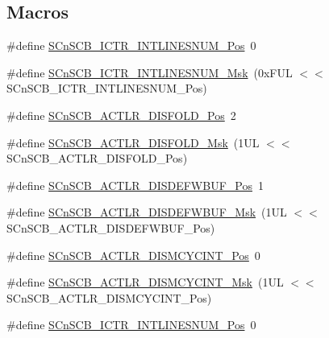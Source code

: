 \subsection*{Macros}
\begin{DoxyCompactItemize}
\item 
\#define \mbox{\hyperlink{group___c_m_s_i_s___s_cn_s_c_b_ga0777ddf379af50f9ca41d40573bfffc5}{S\+Cn\+S\+C\+B\+\_\+\+I\+C\+T\+R\+\_\+\+I\+N\+T\+L\+I\+N\+E\+S\+N\+U\+M\+\_\+\+Pos}}~0
\item 
\#define \mbox{\hyperlink{group___c_m_s_i_s___s_cn_s_c_b_ga3efa0f5210051464e1034b19fc7b33c7}{S\+Cn\+S\+C\+B\+\_\+\+I\+C\+T\+R\+\_\+\+I\+N\+T\+L\+I\+N\+E\+S\+N\+U\+M\+\_\+\+Msk}}~(0x\+F\+U\+L $<$$<$ S\+Cn\+S\+C\+B\+\_\+\+I\+C\+T\+R\+\_\+\+I\+N\+T\+L\+I\+N\+E\+S\+N\+U\+M\+\_\+\+Pos)
\item 
\#define \mbox{\hyperlink{group___c_m_s_i_s___s_cn_s_c_b_gaab395870643a0bee78906bb15ca5bd02}{S\+Cn\+S\+C\+B\+\_\+\+A\+C\+T\+L\+R\+\_\+\+D\+I\+S\+F\+O\+L\+D\+\_\+\+Pos}}~2
\item 
\#define \mbox{\hyperlink{group___c_m_s_i_s___s_cn_s_c_b_gaa9dd2d4a2350499188f438d0aa9fd982}{S\+Cn\+S\+C\+B\+\_\+\+A\+C\+T\+L\+R\+\_\+\+D\+I\+S\+F\+O\+L\+D\+\_\+\+Msk}}~(1\+U\+L $<$$<$ S\+Cn\+S\+C\+B\+\_\+\+A\+C\+T\+L\+R\+\_\+\+D\+I\+S\+F\+O\+L\+D\+\_\+\+Pos)
\item 
\#define \mbox{\hyperlink{group___c_m_s_i_s___s_cn_s_c_b_gafa2eb37493c0f8dae77cde81ecf80f77}{S\+Cn\+S\+C\+B\+\_\+\+A\+C\+T\+L\+R\+\_\+\+D\+I\+S\+D\+E\+F\+W\+B\+U\+F\+\_\+\+Pos}}~1
\item 
\#define \mbox{\hyperlink{group___c_m_s_i_s___s_cn_s_c_b_ga6cda7b7219232a008ec52cc8e89d5d08}{S\+Cn\+S\+C\+B\+\_\+\+A\+C\+T\+L\+R\+\_\+\+D\+I\+S\+D\+E\+F\+W\+B\+U\+F\+\_\+\+Msk}}~(1\+U\+L $<$$<$ S\+Cn\+S\+C\+B\+\_\+\+A\+C\+T\+L\+R\+\_\+\+D\+I\+S\+D\+E\+F\+W\+B\+U\+F\+\_\+\+Pos)
\item 
\#define \mbox{\hyperlink{group___c_m_s_i_s___s_cn_s_c_b_gaaa3e79f5ead4a32c0ea742b2a9ffc0cd}{S\+Cn\+S\+C\+B\+\_\+\+A\+C\+T\+L\+R\+\_\+\+D\+I\+S\+M\+C\+Y\+C\+I\+N\+T\+\_\+\+Pos}}~0
\item 
\#define \mbox{\hyperlink{group___c_m_s_i_s___s_cn_s_c_b_ga2a2818f0489ad10b6ea2964e899d4cbc}{S\+Cn\+S\+C\+B\+\_\+\+A\+C\+T\+L\+R\+\_\+\+D\+I\+S\+M\+C\+Y\+C\+I\+N\+T\+\_\+\+Msk}}~(1\+U\+L $<$$<$ S\+Cn\+S\+C\+B\+\_\+\+A\+C\+T\+L\+R\+\_\+\+D\+I\+S\+M\+C\+Y\+C\+I\+N\+T\+\_\+\+Pos)
\item 
\#define \mbox{\hyperlink{group___c_m_s_i_s___s_cn_s_c_b_ga0777ddf379af50f9ca41d40573bfffc5}{S\+Cn\+S\+C\+B\+\_\+\+I\+C\+T\+R\+\_\+\+I\+N\+T\+L\+I\+N\+E\+S\+N\+U\+M\+\_\+\+Pos}}~0

\end{DoxyCompactItemize}
